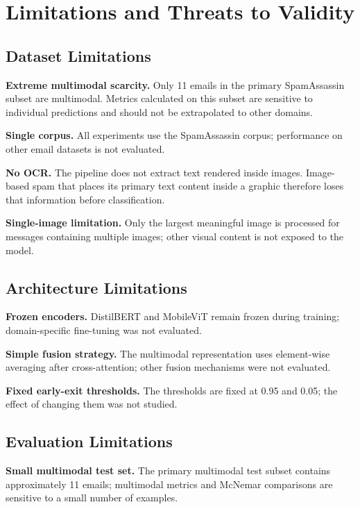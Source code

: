 \documentclass[10pt,twoside]{article}
\begin{document}
\section{Limitations and Threats to Validity}\label{sec:limitations}

\subsection{Dataset Limitations}\label{sec:data-limitations}

\textbf{Extreme multimodal scarcity.} Only 11 emails in the primary SpamAssassin subset are multimodal. Metrics calculated on this subset are sensitive to individual predictions and should not be extrapolated to other domains.

\textbf{Single corpus.} All experiments use the SpamAssassin corpus; performance on other email datasets is not evaluated.

\textbf{No OCR.} The pipeline does not extract text rendered inside images. Image-based spam that places its primary text content inside a graphic therefore loses that information before classification.

\textbf{Single-image limitation.} Only the largest meaningful image is processed for messages containing multiple images; other visual content is not exposed to the model.

\subsection{Architecture Limitations}\label{sec:arch-limitations}

\textbf{Frozen encoders.} DistilBERT and MobileViT remain frozen during training; domain-specific fine-tuning was not evaluated.

\textbf{Simple fusion strategy.} The multimodal representation uses element-wise averaging after cross-attention; other fusion mechanisms were not evaluated.

\textbf{Fixed early-exit thresholds.} The thresholds are fixed at 0.95 and 0.05; the effect of changing them was not studied.

\subsection{Evaluation Limitations}\label{sec:eval-limitations}

\textbf{Small multimodal test set.} The primary multimodal test subset contains approximately 11 emails; multimodal metrics and McNemar comparisons are sensitive to a small number of examples.
\end{document}
